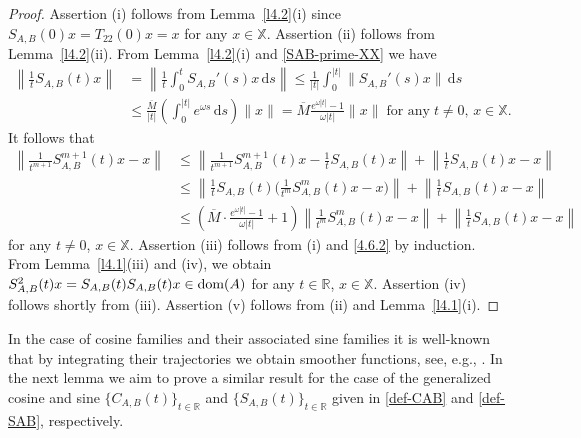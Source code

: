\documentclass[11pt]{amsart}
\numberwithin{equation}{section}
\newcommand{\SAB}{S_{A,B}}
\newcommand{\CAB}{C_{A,B}}
\newcommand{\RR}{{\mathbb R}}
\newcommand{\rmd}{{\mathrm{d}}}
\theoremstyle{remark}
\theoremstyle{definition}
\newcommand\bX{{\mathbb X}}
\newcommand{\dom}{\text{\rm{dom}}}
\begin{document}
\begin{proof}
Assertion (i) follows from Lemma~\ref{l4.2}(i) since $\SAB(0)x = T_{22}(0)x = x$ for any $x\in\bX$. Assertion (ii) follows from Lemma~\ref{l4.2}(ii). From Lemma~\ref{l4.2}(i) and \eqref{SAB-prime-XX} we have
\begin{align}\label{4.6.1}
		\left\| \frac{1}{t} \SAB(t) x \right\|
		&= \left\| \frac{1}{t} \int_0^t \SAB'(s) x \, \rmd s \right\|
		\leq \frac{1}{|t|} \int_0^{|t|} \|\SAB'(s) x\| \, \rmd s\nonumber\\
		&\leq \frac{\overline{M}}{|t|} \left( \int_0^{|t|} e^{\omega s} \, \rmd s \right) \|x\|= \overline{M} \frac{e^{\omega|t|} - 1}{\omega|t|} \|x\|
		\; \text{for any}\; t \neq 0,\, x \in \bX.
	\end{align}
	It follows that
	\begin{align}\label{4.6.2}
		\left\| \frac{1}{t^{m+1}} \SAB^{m+1}(t) x - x \right\|&\leq\left\| \frac{1}{t^{m+1}} \SAB^{m+1}(t) x-\frac{1}{t} \SAB(t) x\right\|+\left\| \frac{1}{t} \SAB(t) x - x \right\|\nonumber\\
		&  \leq \left\| \frac{1}{t} \SAB(t) \Big( \tfrac{1}{t^m}\SAB^m(t)x - x \Big) \right\|
		+ \left\| \frac{1}{t} \SAB(t) x - x \right\|\nonumber\\
		& \leq \left( \overline{M} \cdot \frac{e^{\omega|t|}-1}{\omega|t|} + 1 \right)\left\|\tfrac{1}{t^m}\SAB^m(t)x - x \right\|+
		\left\| \frac{1}{t} \SAB(t) x - x \right\|
	\end{align}
	for any $t\ne 0$, $x \in\bX$. Assertion (iii) follows from (i) and \eqref{4.6.2} by induction. From Lemma~\ref{l4.1}(iii) and (iv),  we obtain $\SAB^2(t)x = \SAB(t)\SAB(t)x \in \dom(A)$ for any $t \in \mathbb{R}$, $x \in\bX$. Assertion (iv) follows shortly from (iii). Assertion (v) follows from (ii) and Lemma~\ref{l4.1}(i).
\end{proof}
In the case of cosine families and their associated sine families it is well-known that by integrating their trajectories we obtain smoother functions, see, e.g., \cite[Proposition 3.14.5]{ABHN}. In the next lemma we aim to prove a similar result for the case of the generalized cosine and sine $\{\CAB(t)\}_{t\in\RR}$ and $\{\SAB(t)\}_{t\in\RR}$ given in \eqref{def-CAB} and \eqref{def-SAB}, respectively.
\end{document}
